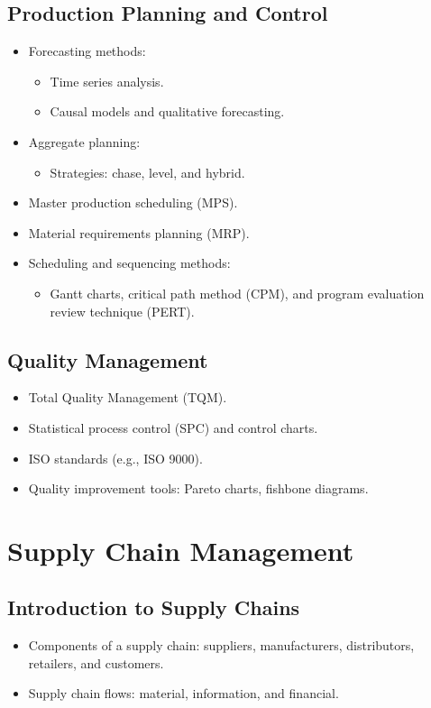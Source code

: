 \subsection{Production Planning and Control}
\begin{itemize}
    \item Forecasting methods:
    \begin{itemize}
        \item Time series analysis.
        \item Causal models and qualitative forecasting.
    \end{itemize}
    \item Aggregate planning:
    \begin{itemize}
        \item Strategies: chase, level, and hybrid.
    \end{itemize}
    \item Master production scheduling (MPS).
    \item Material requirements planning (MRP).
    \item Scheduling and sequencing methods:
    \begin{itemize}
        \item Gantt charts, critical path method (CPM), and program evaluation review technique (PERT).
    \end{itemize}
\end{itemize}

\subsection{Quality Management}
\begin{itemize}
    \item Total Quality Management (TQM).
    \item Statistical process control (SPC) and control charts.
    \item ISO standards (e.g., ISO 9000).
    \item Quality improvement tools: Pareto charts, fishbone diagrams.
\end{itemize}

\section{Supply Chain Management}
\subsection{Introduction to Supply Chains}
\begin{itemize}
    \item Components of a supply chain: suppliers, manufacturers, distributors, retailers, and customers.
    \item Supply chain flows: material, information, and financial.
\end{itemize}

